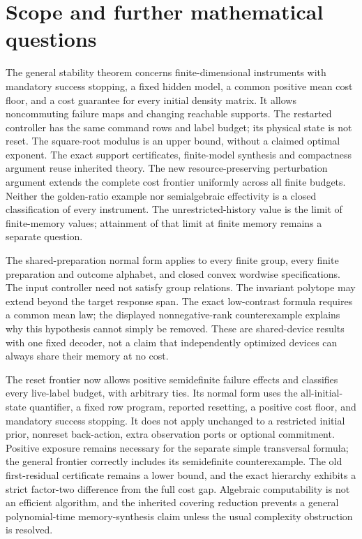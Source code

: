 \section{Scope and further mathematical questions}
\label{sec:r73-scope}\label{sec:r74-scope}\label{sec:r75-scope}\label{sec:r76-scope}\label{sec:r77-scope}\label{sec:r78-scope}\label{sec:r79-scope}
The general stability theorem concerns finite-dimensional instruments
with mandatory success stopping, a fixed hidden model, a common positive
mean cost floor, and a cost guarantee for every initial density matrix.
It allows noncommuting failure maps and changing reachable supports.
The restarted controller has the same command rows and label budget;
its physical state is not reset.  The square-root modulus is an upper
bound, without a claimed optimal exponent.  The exact support
certificates, finite-model synthesis and compactness argument reuse
inherited theory.  The new resource-preserving perturbation argument
extends the complete cost frontier uniformly across all finite budgets.
Neither the golden-ratio example nor semialgebraic effectivity is a
closed classification of every instrument.  The unrestricted-history
value is the limit of finite-memory values; attainment of that limit
at finite memory remains a separate question.

The shared-preparation normal form applies to every finite group, every
finite preparation and outcome alphabet, and closed convex wordwise
specifications.  The input controller need not satisfy group relations.
The invariant polytope may extend beyond the target response span.
The exact low-contrast formula requires a common mean law; the displayed
nonnegative-rank counterexample explains why this hypothesis cannot
simply be removed.  These are shared-device results with one fixed
decoder, not a claim that independently optimized devices can always
share their memory at no cost.

The reset frontier now allows positive semidefinite failure effects
and classifies every live-label budget, with arbitrary ties.  Its normal
form uses the all-initial-state quantifier, a fixed row program, reported
resetting, a positive cost floor, and mandatory success stopping.  It
does not apply unchanged to a restricted initial prior, nonreset
back-action, extra observation ports or optional commitment.  Positive
exposure remains necessary for the separate simple transversal formula;
the general frontier correctly includes its semidefinite counterexample.
The old first-residual certificate remains a lower bound, and the exact
hierarchy exhibits a strict factor-two difference from the full cost gap.
Algebraic computability is not an efficient algorithm, and the inherited
covering reduction prevents a general polynomial-time memory-synthesis
claim unless the usual complexity obstruction is resolved.

